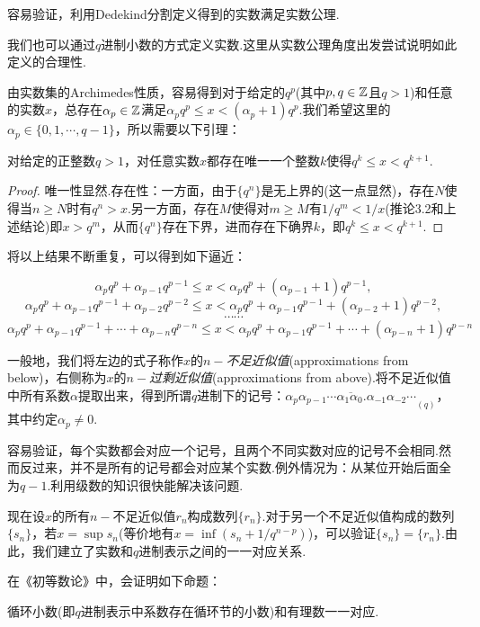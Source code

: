 容易验证，利用Dedekind分割定义得到的实数满足实数公理.

我们也可以通过$q$进制小数的方式定义实数.这里从实数公理角度出发尝试说明如此定义的合理性.

由实数集的Archimedes性质，容易得到对于给定的$q^p$(其中$p,q \in \mathbb{Z}$且$q>1$)和任意的实数$x$，总存在$\alpha _p \in \mathbb{Z}$满足$\alpha _p q^p \leq x < (\alpha _p +1)q^p$.我们希望这里的$\alpha _p \in \{ 0,1,\cdots ,q-1 \}$，所以需要以下引理：

\begin{lemma}
	对给定的正整数$q>1$，对任意实数$x$都存在唯一一个整数$k$使得$q^{k} \leq x < q^{k+1}$.
\end{lemma}
\begin{proof}
	唯一性显然.存在性：一方面，由于$\{ q^n \}$是无上界的(这一点显然)，存在$N$使得当$n \geq N$时有$q^n > x$.另一方面，存在$M$使得对$m \geq M$有$1/q^m < 1/x$(推论3.2和上述结论)即$x > q^m$，从而$\{ q^n \}$存在下界，进而存在下确界$k$，即$q^k \leq x < q^{k+1}$. 
\end{proof}

将以上结果不断重复，可以得到如下逼近：

$$\alpha _p q^p + \alpha _{p-1}q^{p-1} \leq x < \alpha _p q^p + (\alpha _{p-1}+1) q^{p-1},$$
$$\alpha _p q^p + \alpha _{p-1}q^{p-1} + \alpha _{p-2}q^{p-2}  \leq x < \alpha _p q^p + \alpha _{p-1}q^{p-1} + (\alpha _{p-2}+1)q^{p-2} ,$$
$$\cdots \cdots $$
$$\alpha _p q^p + \alpha _{p-1}q^{p-1} + \cdots + \alpha _{p-n}q^{p-n}  \leq x < \alpha _p q^p + \alpha _{p-1}q^{p-1} + \cdots + (\alpha _{p-n}+1)q^{p-n}$$

一般地，我们将左边的式子称作$x$的$n-$\textit{不足近似值}(approximations from below)，右侧称为$x$的$n-$\textit{过剩近似值}(approximations from above).将不足近似值中所有系数$\alpha$提取出来，得到所谓$q$进制下的记号：$\overline{\alpha_p \alpha_{p-1} \cdots \alpha_1 \alpha _0 . \alpha_{-1}\alpha_{-2} \cdots}_{(q)}$，其中约定$\alpha_p \neq 0$.

容易验证，每个实数都会对应一个记号，且两个不同实数对应的记号不会相同.然而反过来，并不是所有的记号都会对应某个实数.例外情况为：从某位开始后面全为$q-1$.利用级数的知识很快能解决该问题.

现在设$x$的所有$n-$不足近似值$r_n$构成数列$\{ r_n \}$.对于另一个不足近似值构成的数列$\{ s_n \}$，若$x=\sup s_n$(等价地有$x=\inf (s_n+1/q^{n-p})$)，可以验证$\{ s_n \}=\{ r_n \}$.由此，我们建立了实数和$q$进制表示之间的一一对应关系.

在《初等数论》中，会证明如下命题：

\begin{proposition}
	循环小数(即$q$进制表示中系数存在循环节的小数)和有理数一一对应.
\end{proposition}

